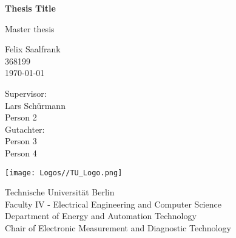 \begin{titlepage}
	\begin{center} %
		\vspace*{1cm} %
		
		\Huge
		\textbf{Thesis Title}
		
		\vspace{0.5cm}
		Master thesis
		
		\vspace{1.5cm}
		\LARGE{Felix Saalfrank}\\
		\large 368199\\
		\vspace{1cm}
		\today
		
		\vspace{1.5cm}
		
		Supervisor:\\
		Lars Sch\"urmann\\
		Person 2\\
		Gutachter:\\
		Person 3\\
		Person 4
		
		\vfill
		
		\vspace{0.8cm}
		
		\texttt{[image: Logos//TU\_Logo.png]}
		
		Technische Universit\"at Berlin\\
		Faculty IV - Electrical Engineering and Computer Science\\
		Department of Energy and Automation Technology\\
		Chair of Electronic Measurement and Diagnostic Technology\\
	\end{center}
\end{titlepage}